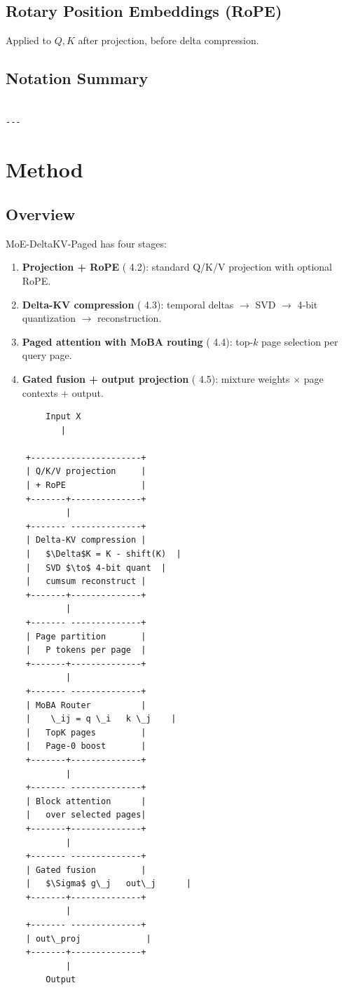 \subsection{Rotary Position Embeddings (RoPE)}

Applied to $Q, K$ after projection, before delta compression.

\subsection{Notation Summary}

\begin{lstlisting}

---
\end{lstlisting}

\section{Method}

\subsection{Overview}

MoE-DeltaKV-Paged has four stages:

\begin{enumerate}
\item \textbf{Projection + RoPE} ( 4.2): standard Q/K/V projection with optional RoPE.
\item \textbf{Delta-KV compression} ( 4.3): temporal deltas $\to$ SVD $\to$ 4-bit quantization $\to$ reconstruction.
\item \textbf{Paged attention with MoBA routing} ( 4.4): top-$k$ page selection per query page.
\item \textbf{Gated fusion + output projection} ( 4.5): mixture weights $\times$ page contexts + output.

\end{enumerate}
\begin{lstlisting}
        Input X
           |
            
    +----------------------+
    | Q/K/V projection     |
    | + RoPE               |
    +-------+--------------+
            |
    +------- --------------+
    | Delta-KV compression |
    |   $\Delta$K = K - shift(K)  |
    |   SVD $\to$ 4-bit quant  |
    |   cumsum reconstruct |
    +-------+--------------+
            |
    +------- --------------+
    | Page partition       |
    |   P tokens per page  |
    +-------+--------------+
            |
    +------- --------------+
    | MoBA Router          |
    |    \_ij = q \_i   k \_j    |
    |   TopK pages         |
    |   Page-0 boost       |
    +-------+--------------+
            |
    +------- --------------+
    | Block attention      |
    |   over selected pages|
    +-------+--------------+
            |
    +------- --------------+
    | Gated fusion         |
    |   $\Sigma$ g\_j   out\_j      |
    +-------+--------------+
            |
    +------- --------------+
    | out\_proj             |
    +-------+--------------+
            |
        Output
\end{lstlisting}


